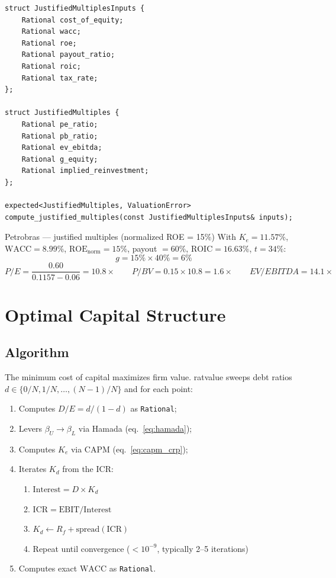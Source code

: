 \documentclass[12pt, a4paper, oneside]{book}
\newcommand{\WACC}{\ensuremath{\mathrm{WACC}}}
\newcommand{\ROIC}{\ensuremath{\mathrm{ROIC}}}
\newcommand{\ROE}{\ensuremath{\mathrm{ROE}}}
\newcommand{\Ke}{K_e}
\newcommand{\Kd}{K_d}
\newcommand{\Rf}{R_f}
\begin{document}
\begin{lstlisting}[style=cpp]
struct JustifiedMultiplesInputs {
    Rational cost_of_equity;
    Rational wacc;
    Rational roe;
    Rational payout_ratio;
    Rational roic;
    Rational tax_rate;
};

struct JustifiedMultiples {
    Rational pe_ratio;
    Rational pb_ratio;
    Rational ev_ebitda;
    Rational g_equity;
    Rational implied_reinvestment;
};

expected<JustifiedMultiples, ValuationError>
compute_justified_multiples(const JustifiedMultiplesInputs& inputs);
\end{lstlisting}

\begin{example}{Petrobras --- justified multiples (normalized ROE = 15\%)}
With $\Ke = 11.57\%$, $\WACC = 8.99\%$, $\ROE_{\text{norm}} = 15\%$,
payout $= 60\%$, $\ROIC = 16.63\%$, $t = 34\%$:
\[
  g = 15\% \times 40\% = 6\%
\]
\[
  P/E = \frac{0.60}{0.1157 - 0.06} = 10.8\times
  \qquad
  P/BV = 0.15 \times 10.8 = 1.6\times
  \qquad
  EV/EBITDA = 14.1\times
\]
\end{example}

\chapter{Optimal Capital Structure}

\section{Algorithm}

The minimum cost of capital maximizes firm value. ratvalue sweeps
debt ratios $d \in \{0/N, 1/N, \ldots, (N-1)/N\}$ and for each point:

\begin{enumerate}
  \item Computes $D/E = d/(1-d)$ as \texttt{Rational};
  \item Levers $\beta_U \to \beta_L$ via Hamada (eq.~\ref{eq:hamada});
  \item Computes $\Ke$ via CAPM (eq.~\ref{eq:capm_crp});
  \item Iterates $\Kd$ from the ICR:
        \begin{enumerate}
          \item $\text{Interest} = D \times \Kd$
          \item $\text{ICR} = \text{EBIT} / \text{Interest}$
          \item $\Kd \leftarrow \Rf + \text{spread}(\text{ICR})$
          \item Repeat until convergence ($< 10^{-9}$, typically 2--5 iterations)
        \end{enumerate}
  \item Computes exact $\WACC$ as \texttt{Rational}.
\end{enumerate}
\end{document}
